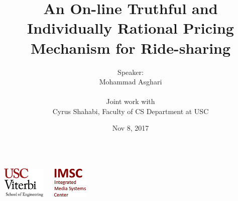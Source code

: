\documentclass[t]{beamer}
\begin{document}
\graphicspath{ {Graphics/}{Graphics/old/} }

\title[USC Viterbi School of Engineering]{An On-line Truthful and Individually Rational Pricing Mechanism for Ride-sharing}  
\author[Mohammad Asghari]{\small{Speaker:}\\Mohammad Asghari\\
\vspace{0.05in}
\begin{flushleft}
\tiny{
\hspace{1.25in}Joint work with\\
\hspace{1.25in}Cyrus Shahabi, Faculty of CS Department at USC}\\
\vspace{-0.25in}
\end{flushleft}}

\date{Nov 8, 2017} 
\begin{frame}
\titlepage
\vspace{-0.5in}
\begin{columns}
  \begin{center}
    \includegraphics[height=1.5cm]{viterbi_logo.jpg}
  \end{center}
  \begin{center}
    \includegraphics[height=1.5cm]{imsc_logo.jpg}   
  \end{center}
\end{columns} 
\end{frame}
\end{document}
